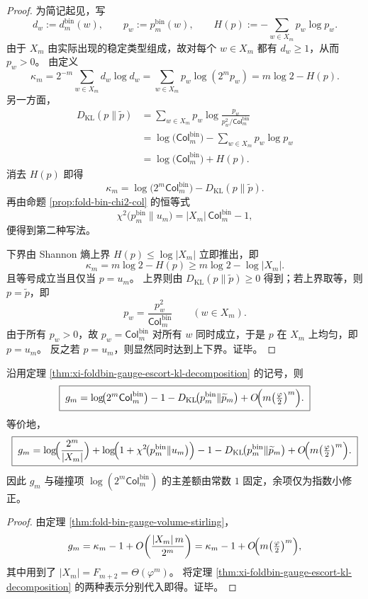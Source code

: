 \begin{proof}
为简记起见，写
\[
d_w:=d_m^{\mathrm{bin}}(w),
\qquad
p_w:=p_m^{\mathrm{bin}}(w),
\qquad
H(p):=-\sum_{w\in X_m}p_w\log p_w.
\]
由于 \(X_m\) 由实际出现的稳定类型组成，故对每个 \(w\in X_m\) 都有 \(d_w\ge 1\)，从而 \(p_w>0\)。
由定义
\[
\kappa_m
=
2^{-m}\sum_{w\in X_m}d_w\log d_w
=
\sum_{w\in X_m}p_w\log(2^m p_w)
=
m\log 2-H(p).
\]
另一方面，
\[
\begin{aligned}
D_{\mathrm{KL}}(p\|\widetilde p)
&=
\sum_{w\in X_m}p_w\log\frac{p_w}{p_w^2/\mathsf{Col}^{\mathrm{bin}}_m}\\
&=
\log\!\bigl(\mathsf{Col}^{\mathrm{bin}}_m\bigr)-\sum_{w\in X_m}p_w\log p_w\\
&=
\log\!\bigl(\mathsf{Col}^{\mathrm{bin}}_m\bigr)+H(p).
\end{aligned}
\]
消去 \(H(p)\) 即得
\[
\kappa_m
=
\log\!\bigl(2^m\mathsf{Col}^{\mathrm{bin}}_m\bigr)
-D_{\mathrm{KL}}(p\|\widetilde p).
\]
再由命题 \ref{prop:fold-bin-chi2-col} 的恒等式
\[
\chi^2\!\bigl(p_m^{\mathrm{bin}}\|u_m\bigr)
=
|X_m|\,\mathsf{Col}^{\mathrm{bin}}_m-1,
\]
便得到第二种写法。

下界由 Shannon 熵上界 \(H(p)\le \log|X_m|\) 立即推出，即
\[
\kappa_m=m\log 2-H(p)\ge m\log 2-\log|X_m|.
\]
且等号成立当且仅当 \(p=u_m\)。
上界则由 \(D_{\mathrm{KL}}(p\|\widetilde p)\ge 0\) 得到；若上界取等，则 \(p=\widetilde p\)，即
\[
p_w=\frac{p_w^2}{\mathsf{Col}^{\mathrm{bin}}_m}
\qquad (w\in X_m).
\]
由于所有 \(p_w>0\)，故 \(p_w=\mathsf{Col}^{\mathrm{bin}}_m\) 对所有 \(w\) 同时成立，于是 \(p\) 在 \(X_m\) 上均匀，即 \(p=u_m\)。
反之若 \(p=u_m\)，则显然同时达到上下界。证毕。
\end{proof}

\begin{corollary}[规范体积密度的碰撞表达与常数主差额]\label{cor:xi-foldbin-gauge-collision-rigid-shift}
沿用定理 \ref{thm:xi-foldbin-gauge-escort-kl-decomposition} 的记号，则
\[
\boxed{\;
g_m
=
\log\!\bigl(2^m\mathsf{Col}^{\mathrm{bin}}_m\bigr)
-1
-D_{\mathrm{KL}}\!\bigl(p_m^{\mathrm{bin}}\|\widetilde p_m\bigr)
+O\!\Bigl(m\bigl(\tfrac{\varphi}{2}\bigr)^m\Bigr).
\;}
\]
等价地，
\[
\boxed{\;
g_m
=
\log\!\Bigl(\frac{2^m}{|X_m|}\Bigr)
+\log\!\Bigl(1+\chi^2\!\bigl(p_m^{\mathrm{bin}}\|u_m\bigr)\Bigr)
-1
-D_{\mathrm{KL}}\!\bigl(p_m^{\mathrm{bin}}\|\widetilde p_m\bigr)
+O\!\Bigl(m\bigl(\tfrac{\varphi}{2}\bigr)^m\Bigr).
\;}
\]
因此 \(g_m\) 与碰撞项 \(\log(2^m\mathsf{Col}^{\mathrm{bin}}_m)\) 的主差额由常数 \(1\) 固定，余项仅为指数小修正。
\end{corollary}
\begin{proof}
由定理 \ref{thm:fold-bin-gauge-volume-stirling}，
\[
g_m=\kappa_m-1+O\!\left(\frac{|X_m|\,m}{2^m}\right)
=
\kappa_m-1+O\!\Bigl(m\bigl(\tfrac{\varphi}{2}\bigr)^m\Bigr),
\]
其中用到了 \(|X_m|=F_{m+2}=\Theta(\varphi^m)\)。
将定理 \ref{thm:xi-foldbin-gauge-escort-kl-decomposition} 的两种表示分别代入即得。证毕。
\end{proof}

